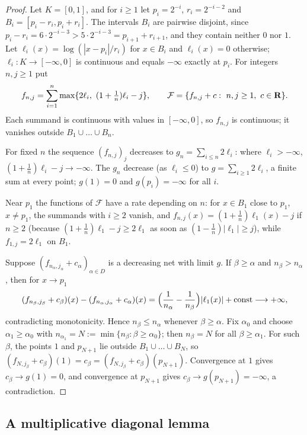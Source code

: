 \begin{proof}
Let $K=[0,1]$, and for $i\ge1$ let $p_i=2^{-i}$, $r_i=2^{-i-2}$ and $B_i=[p_i-r_i,p_i+r_i]$. The intervals $B_i$ are pairwise disjoint,
since $p_i-r_i=6\cdot2^{-i-3}>5\cdot2^{-i-3}=p_{i+1}+r_{i+1}$, and they contain neither $0$ nor $1$. Let $\ell_i(x)=\log(|x-p_i|/r_i)$ for
$x\in B_i$ and $\ell_i(x)=0$ otherwise; $\ell_i\colon K\to[-\infty,0]$ is continuous and equals $-\infty$ exactly at $p_i$. For integers
$n,j\ge1$ put
\[
f_{n,j}=\sum_{i=1}^n\max\{2\ell_i,\ (1+\tfrac1n)\ell_i-j\},\qquad \mathcal F=\{f_{n,j}+c:\ n,j\ge1,\ c\in\R\}.
\]
Each summand is continuous with values in $[-\infty,0]$, so $f_{n,j}$ is continuous; it vanishes outside $B_1\cup\dots\cup B_n$.

For fixed $n$ the sequence $(f_{n,j})_j$ decreases to $g_n=\sum_{i\le n}2\ell_i$: where $\ell_i>-\infty$, $(1+\frac1n)\ell_i-j\to-\infty$. The
$g_n$ decrease (as $\ell_i\le0$) to $g=\sum_{i\ge1}2\ell_i$, a finite sum at every point; $g(1)=0$ and $g(p_i)=-\infty$ for all $i$.

Near $p_1$ the functions of $\mathcal F$ have a rate depending on $n$: for $x\in B_1$ close to $p_1$, $x\ne p_1$, the summands with
$i\ge2$ vanish, and $f_{n,j}(x)=(1+\frac1n)\ell_1(x)-j$ if $n\ge2$ (because $(1+\frac1n)\ell_1-j\ge2\ell_1$ as soon as
$(1-\frac1n)|\ell_1|\ge j$), while $f_{1,j}=2\ell_1$ on $B_1$.

Suppose $(f_{n_\alpha,j_\alpha}+c_\alpha)_{\alpha\in D}$ is a decreasing net with limit $g$. If $\beta\ge\alpha$ and $n_\beta>n_\alpha$, then for $x\to p_1$
\[
(f_{n_\beta,j_\beta}+c_\beta)(x)-(f_{n_\alpha,j_\alpha}+c_\alpha)(x)=\Bigl(\frac1{n_\alpha}-\frac1{n_\beta}\Bigr)|\ell_1(x)|+\text{const}\longrightarrow+\infty,
\]
contradicting monotonicity. Hence $n_\beta\le n_\alpha$ whenever $\beta\ge\alpha$. Fix $\alpha_0$ and choose $\alpha_1\ge\alpha_0$ with
$n_{\alpha_1}=N:=\min\{n_\beta:\beta\ge\alpha_0\}$; then $n_\beta=N$ for all $\beta\ge\alpha_1$. For such $\beta$, the points $1$ and
$p_{N+1}$ lie outside $B_1\cup\dots\cup B_N$, so $(f_{N,j_\beta}+c_\beta)(1)=c_\beta=(f_{N,j_\beta}+c_\beta)(p_{N+1})$. Convergence at $1$ gives
$c_\beta\to g(1)=0$, and convergence at $p_{N+1}$ gives $c_\beta\to g(p_{N+1})=-\infty$, a contradiction.
\end{proof}

\subsection{A multiplicative diagonal lemma}\label{subsec:nn-diagonal}

